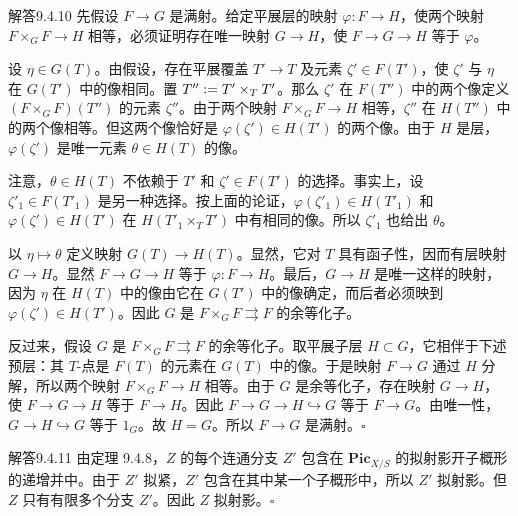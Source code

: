 \begin{origstatement}{解答}{9.4.10}\label{appA:ans9410}
先假设 $F\to G$ 是满射。给定平展层的映射 $\varphi\colon F\to H$，使两个映射 $F\times_G F\to H$ 相等，必须证明存在唯一映射 $G\to H$，使 $F\to G\to H$ 等于 $\varphi$。

设 $\eta\in G(T)$。由假设，存在平展覆盖 $T'\to T$ 及元素 $\zeta'\in F(T')$，使 $\zeta'$ 与 $\eta$ 在 $G(T')$ 中的像相同。置 $T''\mathrel{\mathop:}= T'\times_T T'$。那么 $\zeta'$ 在 $F(T'')$ 中的两个像定义 $(F\times_G F)(T'')$ 的元素 $\zeta''$。由于两个映射 $F\times_G F\to H$ 相等，$\zeta''$ 在 $H(T'')$ 中的两个像相等。但这两个像恰好是 $\varphi(\zeta')\in H(T')$ 的两个像。由于 $H$ 是层，$\varphi(\zeta')$ 是唯一元素 $\theta\in H(T)$ 的像。

注意，$\theta\in H(T)$ 不依赖于 $T'$ 和 $\zeta'\in F(T')$ 的选择。事实上，设 $\zeta'_1\in F(T'_1)$ 是另一种选择。按上面的论证，$\varphi(\zeta'_1)\in H(T'_1)$ 和 $\varphi(\zeta')\in H(T')$ 在 $H(T'_1\times_T T')$ 中有相同的像。所以 $\zeta'_1$ 也给出 $\theta$。

以 $\eta\mapsto\theta$ 定义映射 $G(T)\to H(T)$。显然，它对 $T$ 具有函子性，因而有层映射 $G\to H$。显然 $F\to G\to H$ 等于 $\varphi\colon F\to H$。最后，$G\to H$ 是唯一这样的映射，因为 $\eta$ 在 $H(T)$ 中的像由它在 $G(T')$ 中的像确定，而后者必须映到 $\varphi(\zeta')\in H(T')$。因此 $G$ 是 $F\times_G F\rightrightarrows F$ 的余等化子。

反过来，假设 $G$ 是 $F\times_G F\rightrightarrows F$ 的余等化子。取平展子层 $H\subset G$，它相伴于下述预层：其 $T$-点是 $F(T)$ 的元素在 $G(T)$ 中的像。于是映射 $F\to G$ 通过 $H$ 分解，所以两个映射 $F\times_G F\to H$ 相等。由于 $G$ 是余等化子，存在映射 $G\to H$，使 $F\to G\to H$ 等于 $F\to H$。因此 $F\to G\to H\hookrightarrow G$ 等于 $F\to G$。由唯一性，$G\to H\hookrightarrow G$ 等于 $1_G$。故 $H=G$。所以 $F\to G$ 是满射。\hfill$\square$
\end{origstatement}

\begin{origstatement}{解答}{9.4.11}\label{appA:ans9411}
由定理 9.4.8，$Z$ 的每个连通分支 $Z'$ 包含在 $\mathbf{Pic}_{X/S}$ 的拟射影开子概形的递增并中。由于 $Z'$ 拟紧，$Z'$ 包含在其中某一个子概形中，所以 $Z'$ 拟射影。但 $Z$ 只有有限多个分支 $Z'$。因此 $Z$ 拟射影。\hfill$\square$
\end{origstatement}

